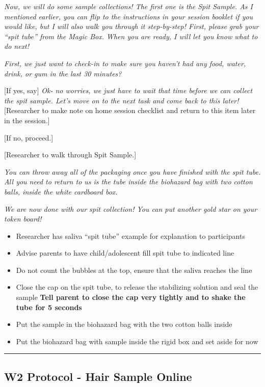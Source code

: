 \documentclass[]{book}
\begin{document}
\emph{Now, we will do some sample collections! The first one is the Spit Sample. As I mentioned earlier, you can flip to the instructions in your session booklet if you would like, but I will also walk you through it step-by-step! First, please grab your ``spit tube'' from the Magic Box. When you are ready, I will let you know what to do next!}

\emph{First, we just want to check-in to make sure you haven't had any food, water, drink, or gum in the last 30 minutes?}

{[}If yes, say{]} \emph{Ok- no worries, we just have to wait that time before we can collect the spit sample. Let's move on to the next task and come back to this later!} {[}Researcher to make note on home session checklist and return to this item later in the session.{]}

{[}If no, proceed.{]}

{[}Researcher to walk through Spit Sample.{]}

\emph{You can throw away all of the packaging once you have finished with the spit tube. All you need to return to us is the tube inside the biohazard bag with two cotton balls, inside the white cardboard box.}

\emph{We are now done with our spit collection! You can put another gold star on your token board!}

\begin{itemize}
\item
  Researcher has saliva ``spit tube'' example for explanation to participants
\item
  Advise parents to have child/adolescent fill spit tube to indicated line
\item
  Do not count the bubbles at the top, ensure that the saliva reaches the line
\item
  Close the cap on the spit tube, to release the stabilizing solution and seal the sample
  \textbf{Tell parent to close the cap very tightly and to shake the tube for 5 seconds}
\item
  Put the sample in the biohazard bag with the two cotton balls inside
\item
  Put the biohazard bag with sample inside the rigid box and set aside for now
\end{itemize}

\begin{center}\rule{0.5\linewidth}{0.5pt}\end{center}

\hypertarget{w2-protocol---hair-sample-online}{%
\subsection{W2 Protocol - Hair Sample Online}\label{w2-protocol---hair-sample-online}}
\end{document}
